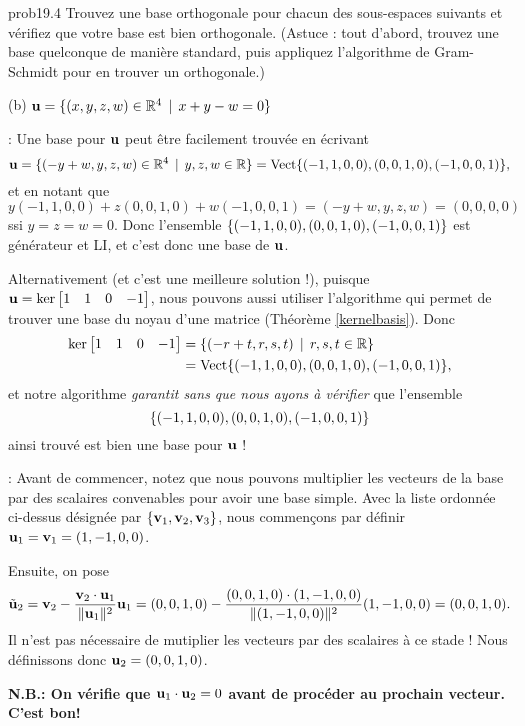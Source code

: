 \bigskip
\begin{sol}{prob19.4} Trouvez une base orthogonale pour chacun des sous-espaces suivants et vérifiez que votre base est bien orthogonale. (Astuce : tout d'abord, trouvez une base quelconque de manière standard, puis appliquez l'algorithme de Gram-Schmidt pour en trouver un orthogonale.)
\medskip

(b) $\mathbf{u}=\{(x,y,z, w)\in\mathbb{R}^4 \, \mid \, x+y-w=0\}$


\soln {} : Une base pour $\mathbf{u}$ peut être facilement trouvée en écrivant
$$\mathbf{u}=\{(-y+w,y,z, w)\in\mathbb{R}^4 \, \mid \, y,z,w\in \mathbb{R}\}=\operatorname{ Vect} \normalsize\{(-1,1,0,0),(0,0,1,0),(-1,0,0,1)\normalsize\},$$ et en notant que 
$ y(-1,1,0,0)+z(0,0,1,0)+w(-1,0,0,1)=(-y+w,y,z, w)=(0,0,0,0)$ ssi  $y=z=w=0$. Donc l'ensemble $\{(-1,1,0,0),(0,0,1,0),(-1,0,0,1)\}$ est générateur et LI, et c'est donc une base de $\mathbf{u}$. 

Alternativement (et c'est une meilleure solution !), puisque $\uu=\ker \bmatrix 1&1&0&-1 \endbmatrix$, nous pouvons aussi utiliser l'algorithme qui permet de trouver une base du noyau d'une matrice (Théorème \ref{kernelbasis}). Donc
\begin{align*}\ker \bmatrix 1&1&0&-1 \endbmatrix &=\set{(-r+t,r,s,t)\st r,s,t \in \R }\\ 
&=\sp{(-1,1,0,0),(0,0,1,0),(-1,0,0,1)},
\end{align*}
et notre algorithme {\it garantit sans que nous ayons à vérifier} que l'ensemble $$\{(-1,1,0,0),(0,0,1,0),(-1,0,0,1)\}$$ ainsi trouvé est bien une base pour $\mathbf{u}$ !

\smallskip
{} : Avant de commencer, notez que nous pouvons multiplier les vecteurs de la base par des scalaires convenables pour avoir une base simple. 
Avec la liste ordonnée ci-dessus désignée par $\{\mathbf{v}_1, \mathbf{v}_2, \mathbf{v}_3\}$, nous commençons par définir $\mathbf{u}_1=\mathbf{v}_1=(1, -1, 0, 0)$. 

Ensuite, on pose $$\tilde {\mathbf{u}}_2= \mathbf{v}_2 -\frac{\mathbf{v}_2\cdot \mathbf{u}_1}{\| \mathbf{u}_1\|^2}\mathbf{u}_1=(0,0,1,0)-\frac{(0,0,1,0)\cdot (1, -1, 0, 0)}{\| (1, -1, 0, 0)\|^2}(1, -1, 0, 0)=(0,0,1,0).$$ Il n'est pas nécessaire de mutiplier les vecteurs par des scalaires à ce stade ! Nous définissons donc $\mathbf{u}_2=(0,0,1,0)$. 

 {\bf N.B.: On v\'erifie que $\mathbf{u}_1\cdot \mathbf{u}_2=0$ avant de proc\'eder au prochain vecteur. C'est bon!}


\end{sol}
